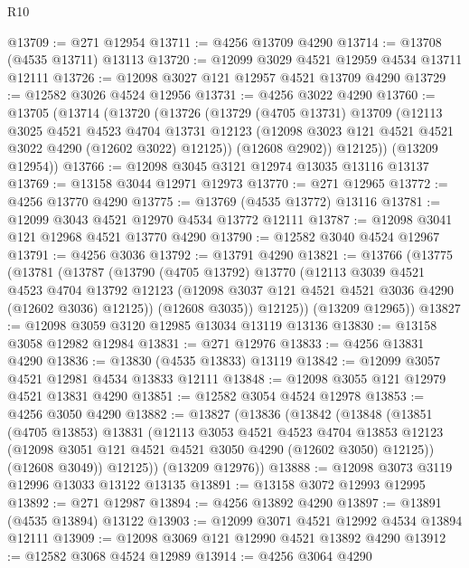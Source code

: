 \begin{lexlean}{R10}
\begin{coremodule}
@13709 := @271 @12954
@13711 := @4256 @13709 @4290
@13714 := @13708 (@4535 @13711) @13113
@13720 := @12099 @3029 @4521 @12959 @4534 @13711 @12111
@13726 := @12098 @3027 @121 @12957 @4521 @13709 @4290
@13729 := @12582 @3026 @4524 @12956
@13731 := @4256 @3022 @4290
@13760 := @13705
    (@13714
      (@13720
        (@13726
          (@13729
            (@4705 @13731)
            @13709
            (@12113
              @3025
              @4521
              @4523
              @4704
              @13731
              @12123
              (@12098 @3023 @121 @4521 @4521 @3022 @4290 (@12602 @3022) @12125))
            (@12608 @2902))
          @12125))
      (@13209 @12954))
@13766 := @12098 @3045 @3121 @12974 @13035 @13116 @13137
@13769 := @13158 @3044 @12971 @12973
@13770 := @271 @12965
@13772 := @4256 @13770 @4290
@13775 := @13769 (@4535 @13772) @13116
@13781 := @12099 @3043 @4521 @12970 @4534 @13772 @12111
@13787 := @12098 @3041 @121 @12968 @4521 @13770 @4290
@13790 := @12582 @3040 @4524 @12967
@13791 := @4256 @3036
@13792 := @13791 @4290
@13821 := @13766
    (@13775
      (@13781
        (@13787
          (@13790
            (@4705 @13792)
            @13770
            (@12113
              @3039
              @4521
              @4523
              @4704
              @13792
              @12123
              (@12098 @3037 @121 @4521 @4521 @3036 @4290 (@12602 @3036) @12125))
            (@12608 @3035))
          @12125))
      (@13209 @12965))
@13827 := @12098 @3059 @3120 @12985 @13034 @13119 @13136
@13830 := @13158 @3058 @12982 @12984
@13831 := @271 @12976
@13833 := @4256 @13831 @4290
@13836 := @13830 (@4535 @13833) @13119
@13842 := @12099 @3057 @4521 @12981 @4534 @13833 @12111
@13848 := @12098 @3055 @121 @12979 @4521 @13831 @4290
@13851 := @12582 @3054 @4524 @12978
@13853 := @4256 @3050 @4290
@13882 := @13827
    (@13836
      (@13842
        (@13848
          (@13851
            (@4705 @13853)
            @13831
            (@12113
              @3053
              @4521
              @4523
              @4704
              @13853
              @12123
              (@12098 @3051 @121 @4521 @4521 @3050 @4290 (@12602 @3050) @12125))
            (@12608 @3049))
          @12125))
      (@13209 @12976))
@13888 := @12098 @3073 @3119 @12996 @13033 @13122 @13135
@13891 := @13158 @3072 @12993 @12995
@13892 := @271 @12987
@13894 := @4256 @13892 @4290
@13897 := @13891 (@4535 @13894) @13122
@13903 := @12099 @3071 @4521 @12992 @4534 @13894 @12111
@13909 := @12098 @3069 @121 @12990 @4521 @13892 @4290
@13912 := @12582 @3068 @4524 @12989
@13914 := @4256 @3064 @4290

\end{coremodule}
\end{lexlean}
